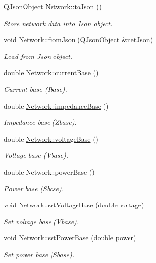 \begin{DoxyCompactItemize}
Q\+Json\+Object \hyperlink{group___models_ga1bb9773d3935eefef84136d388786494}{Network\+::to\+Json} ()
\begin{DoxyCompactList}\small\item\em Store network data into Json object. \end{DoxyCompactList}\item 
void \hyperlink{group___models_ga2aef0f6c0d9569ec4d6b948d1ef0d5f1}{Network\+::from\+Json} (Q\+Json\+Object \&net\+Json)
\begin{DoxyCompactList}\small\item\em Load from Json object. \end{DoxyCompactList}\item 
double \hyperlink{group___models_ga433bc5c32cf2ce5329bb40b21952d885}{Network\+::current\+Base} ()
\begin{DoxyCompactList}\small\item\em Current base (Ibase). \end{DoxyCompactList}\item 
double \hyperlink{group___models_gae6794c93d37df113778c37c2c702f6d9}{Network\+::impedance\+Base} ()
\begin{DoxyCompactList}\small\item\em Impedance base (Zbase). \end{DoxyCompactList}\item 
double \hyperlink{group___models_ga88cd2506aaf0b19513e41f00608093e0}{Network\+::voltage\+Base} ()
\begin{DoxyCompactList}\small\item\em Voltage base (Vbase). \end{DoxyCompactList}\item 
double \hyperlink{group___models_ga6fdbd7d04d12a3f1215c92e2e20eabdb}{Network\+::power\+Base} ()
\begin{DoxyCompactList}\small\item\em Power base (Sbase). \end{DoxyCompactList}\item 
void \hyperlink{group___models_gac2787bb9c323716baa2e6fba06136f2b}{Network\+::set\+Voltage\+Base} (double voltage)
\begin{DoxyCompactList}\small\item\em Set voltage base (Vbase). \end{DoxyCompactList}\item 
void \hyperlink{group___models_ga3ba9ef05ea0c5037a415cfab25d03a0d}{Network\+::set\+Power\+Base} (double power)
\begin{DoxyCompactList}\small\item\em Set power base (Sbase). \end{DoxyCompactList}\end{DoxyCompactItemize}
